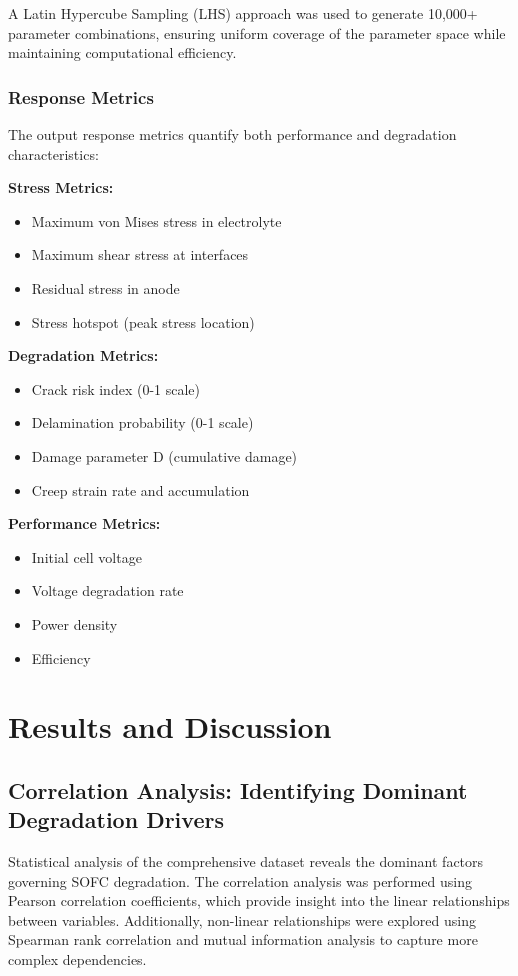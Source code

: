 \documentclass[conference]{IEEEtran}
\begin{document}
A Latin Hypercube Sampling (LHS) approach was used to generate 10,000+ parameter combinations, ensuring uniform coverage of the parameter space while maintaining computational efficiency.

\subsubsection{Response Metrics}

The output response metrics quantify both performance and degradation characteristics:

\textbf{Stress Metrics:}
\begin{itemize}
\item Maximum von Mises stress in electrolyte
\item Maximum shear stress at interfaces
\item Residual stress in anode
\item Stress hotspot (peak stress location)
\end{itemize}

\textbf{Degradation Metrics:}
\begin{itemize}
\item Crack risk index (0-1 scale)
\item Delamination probability (0-1 scale)
\item Damage parameter D (cumulative damage)
\item Creep strain rate and accumulation
\end{itemize}

\textbf{Performance Metrics:}
\begin{itemize}
\item Initial cell voltage
\item Voltage degradation rate
\item Power density
\item Efficiency
\end{itemize}

\section{Results and Discussion}

\subsection{Correlation Analysis: Identifying Dominant Degradation Drivers}

Statistical analysis of the comprehensive dataset reveals the dominant factors governing SOFC degradation. The correlation analysis was performed using Pearson correlation coefficients, which provide insight into the linear relationships between variables. Additionally, non-linear relationships were explored using Spearman rank correlation and mutual information analysis to capture more complex dependencies.
\end{document}
